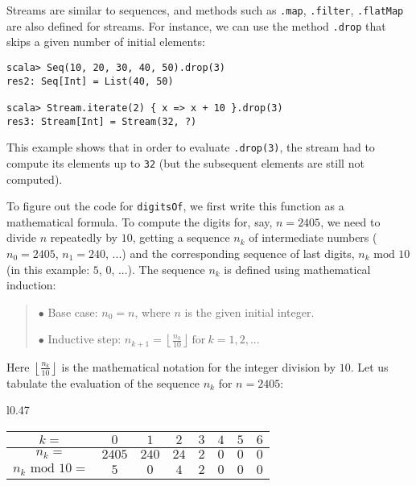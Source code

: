 Streams are similar to sequences, and methods such as \lstinline!.map!,
\lstinline!.filter!, \lstinline!.flatMap! are also defined for streams.
For instance, we can use the method \lstinline!.drop! that skips
a given number of initial elements:
\begin{lstlisting}
scala> Seq(10, 20, 30, 40, 50).drop(3)
res2: Seq[Int] = List(40, 50)

scala> Stream.iterate(2) { x => x + 10 }.drop(3)
res3: Stream[Int] = Stream(32, ?)
\end{lstlisting}
This example shows that in order to evaluate \lstinline!.drop(3)!,
the stream had to compute its elements up to \lstinline!32! (but
the subsequent elements are still not computed).

To figure out the code for \lstinline!digitsOf!, we first write this
function as a mathematical formula. To compute the digits for, say,
$n=2405$, we need to divide $n$ repeatedly by $10$, getting a sequence
$n_{k}$ of intermediate numbers ($n_{0}=2405$, $n_{1}=240$, ...)
and the corresponding sequence of last digits, $n_{k}\text{ mod }10$
(in this example: $5$, $0$, ...). The sequence $n_{k}$ is defined
using mathematical induction:
\begin{quotation}
$\bullet$ Base case: $n_{0}=n$, where $n$ is the given initial
integer.

$\bullet$ Inductive step: $n_{k+1}=\left\lfloor \frac{n_{k}}{10}\right\rfloor \ \text{for}\ k=1,2,...$
\end{quotation}
Here $\left\lfloor \frac{n_{k}}{10}\right\rfloor $ is the mathematical
notation for the integer division by $10$. Let us tabulate the evaluation
of the sequence $n_{k}$ for $n=2405$: 

\begin{wraptable}{l}{0.47\columnwidth}%
\begin{centering}
\vspace{-0.85\baselineskip}
\begin{tabular}{|c|c|c|c|c|c|c|c|}
\hline 
{\small{}$k=$} & {\small{}$0$} & {\small{}$1$} & {\small{}$2$} & {\small{}$3$} & {\small{}$4$} & {\small{}$5$} & {\small{}$6$}\tabularnewline
\hline 
{\small{}$n_{k}=$} & {\small{}$2405$} & {\small{}$240$} & {\small{}$24$} & {\small{}$2$} & {\small{}$0$} & {\small{}$0$} & {\small{}$0$}\tabularnewline
\hline 
{\small{}$n_{k}\text{ mod }10=$} & {\small{}$5$} & {\small{}$0$} & {\small{}$4$} & {\small{}$2$} & {\small{}$0$} & {\small{}$0$} & {\small{}$0$}\tabularnewline
\hline 
\end{tabular}
\par\end{centering}
\vspace{-1\baselineskip}
\end{wraptable}%

